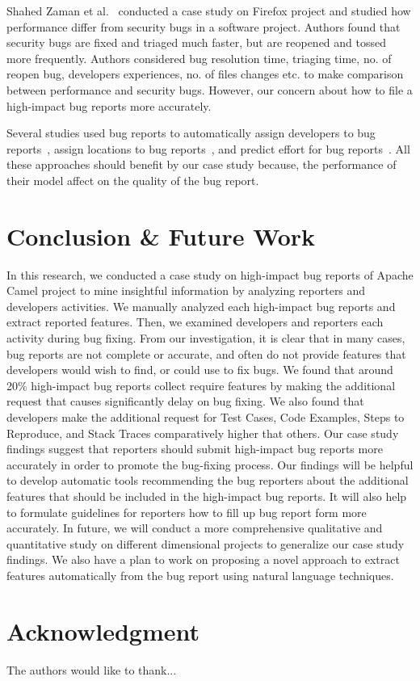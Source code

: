 \documentclass[conference]{IEEEtran}
\begin{document}
Shahed Zaman et al.~\cite{Zaman:2011} conducted a case study on Firefox project and studied how performance differ from security bugs in a software project. Authors found that security bugs are fixed and triaged much faster, but are reopened and tossed more frequently. Authors considered bug resolution time, triaging time, no. of reopen bug, developers experiences, no. of files changes etc. to make comparison between performance and security bugs. However, our concern about how to file a high-impact bug reports more accurately. 

Several studies used bug reports to automatically assign developers
to bug reports~\cite{Anvik:2006}, assign locations to bug reports~\cite{Canfora:2006}, and predict effort for bug reports~\cite{Weiss:2007}. All these approaches should benefit
by our case study because, the performance of their model affect on the quality of the bug report.

\section{Conclusion \& Future Work}
In this research, we conducted a case study on high-impact bug reports of Apache Camel project to mine insightful information by analyzing reporters and developers activities. We manually analyzed each high-impact bug reports and extract reported features. Then, we examined developers and reporters each activity during bug fixing. From our investigation, it is clear that in many cases, bug reports are not complete or accurate, and often do not provide
features that developers would wish to find, or could use to fix bugs. We found that around 20\% high-impact bug reports collect require features by making the additional request that causes significantly delay on bug fixing. We also found that developers make the additional request for Test Cases, Code Examples, Steps to Reproduce, and Stack Traces comparatively higher that others. Our case study findings suggest that reporters should submit high-impact bug reports more accurately in order to promote the bug-fixing process. Our findings will be helpful to develop automatic tools recommending the bug reporters about the additional features that should be included in the high-impact bug reports. It will also help to formulate guidelines for reporters how to fill up bug report form more accurately. In future, we will conduct a more comprehensive qualitative and quantitative study on different dimensional projects to generalize our case study findings. We also have a plan to work on proposing a novel approach to extract features automatically from the bug report using natural language techniques.




\section*{Acknowledgment}
The authors would like to thank...
  
  

\end{document}
